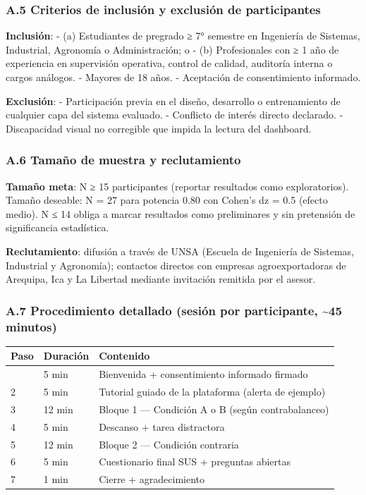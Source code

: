 \subsubsection{A.5 Criterios de inclusión y exclusión de
participantes}\label{a.5-criterios-de-inclusiuxf3n-y-exclusiuxf3n-de-participantes}

\textbf{Inclusión}: - (a) Estudiantes de pregrado ≥ 7° semestre en
Ingeniería de Sistemas, Industrial, Agronomía o Administración; o - (b)
Profesionales con ≥ 1 año de experiencia en supervisión operativa,
control de calidad, auditoría interna o cargos análogos. - Mayores de 18
años. - Aceptación de consentimiento informado.

\textbf{Exclusión}: - Participación previa en el diseño, desarrollo o
entrenamiento de cualquier capa del sistema evaluado. - Conflicto de
interés directo declarado. - Discapacidad visual no corregible que
impida la lectura del dashboard.

\subsubsection{A.6 Tamaño de muestra y
reclutamiento}\label{a.6-tamauxf1o-de-muestra-y-reclutamiento}

\textbf{Tamaño meta}: N ≥ 15 participantes (reportar resultados como
exploratorios). Tamaño deseable: N = 27 para potencia 0.80 con Cohen's
dz = 0.5 (efecto medio). N ≤ 14 obliga a marcar resultados como
preliminares y sin pretensión de significancia estadística.

\textbf{Reclutamiento}: difusión a través de UNSA (Escuela de Ingeniería
de Sistemas, Industrial y Agronomía); contactos directos con empresas
agroexportadoras de Arequipa, Ica y La Libertad mediante invitación
remitida por el asesor.

\subsubsection{A.7 Procedimiento detallado (sesión por participante,
\textasciitilde45
minutos)}\label{a.7-procedimiento-detallado-sesiuxf3n-por-participante-45-minutos}

\begin{longtable}[]{@{}lll@{}}
\toprule\noalign{}
Paso & Duración & Contenido \\
\midrule\noalign{}
\endhead
\bottomrule\noalign{}
\endlastfoot
1 & 5 min & Bienvenida + consentimiento informado firmado \\
2 & 5 min & Tutorial guiado de la plataforma (alerta de ejemplo) \\
3 & 12 min & Bloque 1 --- Condición A o B (según contrabalanceo) \\
4 & 5 min & Descanso + tarea distractora \\
5 & 12 min & Bloque 2 --- Condición contraria \\
6 & 5 min & Cuestionario final SUS + preguntas abiertas \\
7 & 1 min & Cierre + agradecimiento \\
\end{longtable}

